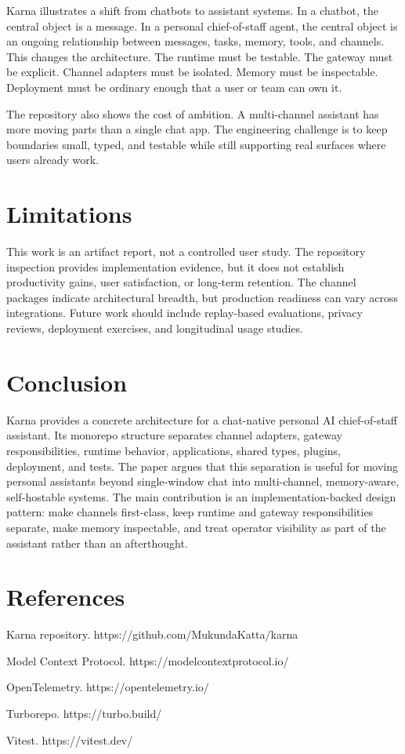 \documentclass[11pt]{article}
\begin{document}
Karna illustrates a shift from chatbots to assistant systems. In a chatbot, the central object is a message. In a personal chief-of-staff agent, the central object is an ongoing relationship between messages, tasks, memory, tools, and channels. This changes the architecture. The runtime must be testable. The gateway must be explicit. Channel adapters must be isolated. Memory must be inspectable. Deployment must be ordinary enough that a user or team can own it.

The repository also shows the cost of ambition. A multi-channel assistant has more moving parts than a single chat app. The engineering challenge is to keep boundaries small, typed, and testable while still supporting real surfaces where users already work.

\section{Limitations}

This work is an artifact report, not a controlled user study. The repository inspection provides implementation evidence, but it does not establish productivity gains, user satisfaction, or long-term retention. The channel packages indicate architectural breadth, but production readiness can vary across integrations. Future work should include replay-based evaluations, privacy reviews, deployment exercises, and longitudinal usage studies.

\section{Conclusion}

Karna provides a concrete architecture for a chat-native personal AI chief-of-staff assistant. Its monorepo structure separates channel adapters, gateway responsibilities, runtime behavior, applications, shared types, plugins, deployment, and tests. The paper argues that this separation is useful for moving personal assistants beyond single-window chat into multi-channel, memory-aware, self-hostable systems. The main contribution is an implementation-backed design pattern: make channels first-class, keep runtime and gateway responsibilities separate, make memory inspectable, and treat operator visibility as part of the assistant rather than an afterthought.

\section*{References}

Karna repository. https://github.com/MukundaKatta/karna

Model Context Protocol. https://modelcontextprotocol.io/

OpenTelemetry. https://opentelemetry.io/

Turborepo. https://turbo.build/

Vitest. https://vitest.dev/
\end{document}
